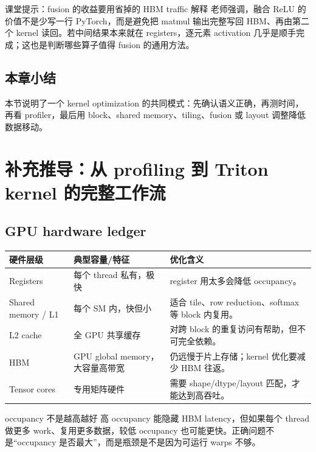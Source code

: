 \documentclass[a4paper]{article}
\begin{document}
\begin{knowledgebox}{课堂提示：fusion 的收益要用省掉的 HBM traffic 解释}
老师强调，融合 ReLU 的价值不是少写一行 PyTorch，而是避免把 matmul 输出完整写回 HBM、再由第二个 kernel 读回。若中间结果本来就在 registers，逐元素 activation 几乎是顺手完成；这也是判断哪些算子值得 fusion 的通用方法。
\end{knowledgebox}
\subsection{本章小结}
本节说明了一个 kernel optimization 的共同模式：先确认语义正确，再测时间，再看 profiler，最后用 block、shared memory、tiling、fusion 或 layout 调整降低数据移动。




\section{补充推导：从 profiling 到 Triton kernel 的完整工作流}

\subsection{GPU hardware ledger}

\begin{longtable}{p{}p{}p{}}
\toprule
\textbf{硬件层级} & \textbf{典型容量/特征} & \textbf{优化含义} \\
\midrule
Registers & 每个 thread 私有，极快 & register 用太多会降低 occupancy。 \\
Shared memory / L1 & 每个 SM 内，快但小 & 适合 tile、row reduction、softmax 等 block 内复用。 \\
L2 cache & 全 GPU 共享缓存 & 对跨 block 的重复访问有帮助，但不可完全依赖。 \\
HBM & GPU global memory，大容量高带宽 & 仍远慢于片上存储；kernel 优化要减少 HBM 往返。 \\
Tensor cores & 专用矩阵硬件 & 需要 shape/dtype/layout 匹配，才能达到高吞吐。 \\
\bottomrule
\end{longtable}

\begin{warningbox}{occupancy 不是越高越好}
高 occupancy 能隐藏 HBM latency，但如果每个 thread 做更多 work、复用更多数据，较低 occupancy 也可能更快。正确问题不是“occupancy 是否最大”，而是瓶颈是不是因为可运行 warps 不够。
\end{warningbox}
\end{document}
